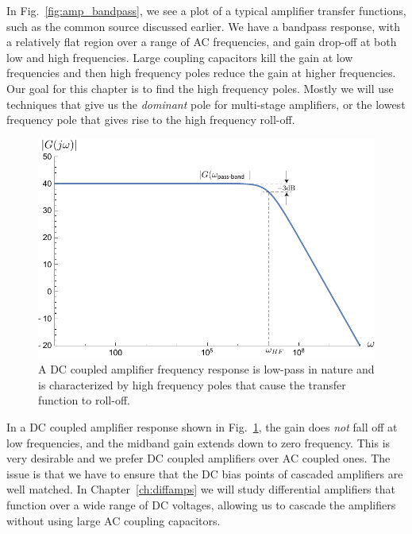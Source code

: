 In Fig.~\ref{fig:amp_bandpass}, we see a plot of a typical amplifier transfer functions, such as the common source discussed earlier.  We have a bandpass response, with a relatively flat region over a range of AC frequencies, and gain drop-off at both low and high frequencies.  Large coupling capacitors kill the gain at low frequencies and then high frequency poles reduce the gain at higher frequencies. Our goal for this chapter is to find the high frequency poles.  Mostly we will use techniques that give us the \emph{dominant} pole for multi-stage amplifiers, or the lowest frequency pole that gives rise to the high frequency roll-off.
\begin{figure}[tb]
\begin{center}
\includegraphics[width=.75\columnwidth]{amp_dccoup} 
\end{center}
\caption{A DC coupled amplifier frequency response is low-pass in nature and is characterized by high frequency poles that cause the transfer function to roll-off.}
\label{fig:amp_dccoup}
\end{figure}

In a DC coupled amplifier response shown in Fig.~\ref{fig:amp_dccoup}, the gain does \textit{not} fall off at low frequencies, and the midband gain extends down to zero frequency. This is very desirable and we prefer DC coupled amplifiers over AC coupled ones.  The issue is that we have to ensure that the DC bias points of cascaded amplifiers are well matched.  In Chapter~\ref{ch:diffamps} we will study differential amplifiers that function over a wide range of DC voltages, allowing us to cascade the amplifiers without using large AC coupling capacitors.
